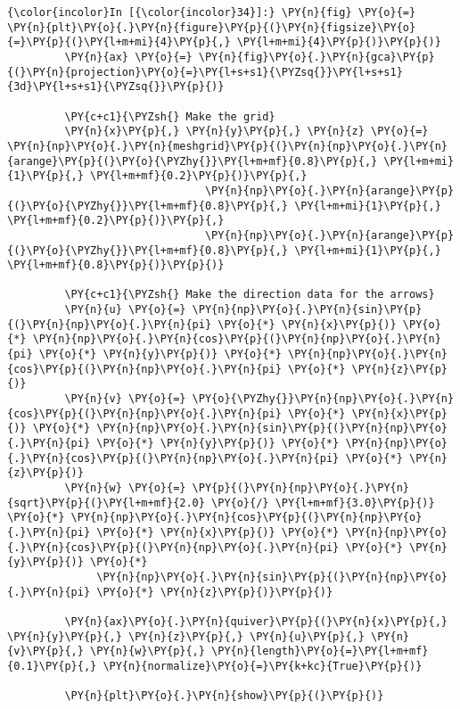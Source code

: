     \begin{Verbatim}[commandchars=\\\{\},frame=single,framerule=0.3mm,rulecolor=\color{cellframecolor}]
{\color{incolor}In [{\color{incolor}34}]:} \PY{n}{fig} \PY{o}{=} \PY{n}{plt}\PY{o}{.}\PY{n}{figure}\PY{p}{(}\PY{n}{figsize}\PY{o}{=}\PY{p}{(}\PY{l+m+mi}{4}\PY{p}{,} \PY{l+m+mi}{4}\PY{p}{)}\PY{p}{)}
         \PY{n}{ax} \PY{o}{=} \PY{n}{fig}\PY{o}{.}\PY{n}{gca}\PY{p}{(}\PY{n}{projection}\PY{o}{=}\PY{l+s+s1}{\PYZsq{}}\PY{l+s+s1}{3d}\PY{l+s+s1}{\PYZsq{}}\PY{p}{)}
         
         \PY{c+c1}{\PYZsh{} Make the grid}
         \PY{n}{x}\PY{p}{,} \PY{n}{y}\PY{p}{,} \PY{n}{z} \PY{o}{=} \PY{n}{np}\PY{o}{.}\PY{n}{meshgrid}\PY{p}{(}\PY{n}{np}\PY{o}{.}\PY{n}{arange}\PY{p}{(}\PY{o}{\PYZhy{}}\PY{l+m+mf}{0.8}\PY{p}{,} \PY{l+m+mi}{1}\PY{p}{,} \PY{l+m+mf}{0.2}\PY{p}{)}\PY{p}{,}
                               \PY{n}{np}\PY{o}{.}\PY{n}{arange}\PY{p}{(}\PY{o}{\PYZhy{}}\PY{l+m+mf}{0.8}\PY{p}{,} \PY{l+m+mi}{1}\PY{p}{,} \PY{l+m+mf}{0.2}\PY{p}{)}\PY{p}{,}
                               \PY{n}{np}\PY{o}{.}\PY{n}{arange}\PY{p}{(}\PY{o}{\PYZhy{}}\PY{l+m+mf}{0.8}\PY{p}{,} \PY{l+m+mi}{1}\PY{p}{,} \PY{l+m+mf}{0.8}\PY{p}{)}\PY{p}{)}
         
         \PY{c+c1}{\PYZsh{} Make the direction data for the arrows}
         \PY{n}{u} \PY{o}{=} \PY{n}{np}\PY{o}{.}\PY{n}{sin}\PY{p}{(}\PY{n}{np}\PY{o}{.}\PY{n}{pi} \PY{o}{*} \PY{n}{x}\PY{p}{)} \PY{o}{*} \PY{n}{np}\PY{o}{.}\PY{n}{cos}\PY{p}{(}\PY{n}{np}\PY{o}{.}\PY{n}{pi} \PY{o}{*} \PY{n}{y}\PY{p}{)} \PY{o}{*} \PY{n}{np}\PY{o}{.}\PY{n}{cos}\PY{p}{(}\PY{n}{np}\PY{o}{.}\PY{n}{pi} \PY{o}{*} \PY{n}{z}\PY{p}{)}
         \PY{n}{v} \PY{o}{=} \PY{o}{\PYZhy{}}\PY{n}{np}\PY{o}{.}\PY{n}{cos}\PY{p}{(}\PY{n}{np}\PY{o}{.}\PY{n}{pi} \PY{o}{*} \PY{n}{x}\PY{p}{)} \PY{o}{*} \PY{n}{np}\PY{o}{.}\PY{n}{sin}\PY{p}{(}\PY{n}{np}\PY{o}{.}\PY{n}{pi} \PY{o}{*} \PY{n}{y}\PY{p}{)} \PY{o}{*} \PY{n}{np}\PY{o}{.}\PY{n}{cos}\PY{p}{(}\PY{n}{np}\PY{o}{.}\PY{n}{pi} \PY{o}{*} \PY{n}{z}\PY{p}{)}
         \PY{n}{w} \PY{o}{=} \PY{p}{(}\PY{n}{np}\PY{o}{.}\PY{n}{sqrt}\PY{p}{(}\PY{l+m+mf}{2.0} \PY{o}{/} \PY{l+m+mf}{3.0}\PY{p}{)} \PY{o}{*} \PY{n}{np}\PY{o}{.}\PY{n}{cos}\PY{p}{(}\PY{n}{np}\PY{o}{.}\PY{n}{pi} \PY{o}{*} \PY{n}{x}\PY{p}{)} \PY{o}{*} \PY{n}{np}\PY{o}{.}\PY{n}{cos}\PY{p}{(}\PY{n}{np}\PY{o}{.}\PY{n}{pi} \PY{o}{*} \PY{n}{y}\PY{p}{)} \PY{o}{*}
              \PY{n}{np}\PY{o}{.}\PY{n}{sin}\PY{p}{(}\PY{n}{np}\PY{o}{.}\PY{n}{pi} \PY{o}{*} \PY{n}{z}\PY{p}{)}\PY{p}{)}
         
         \PY{n}{ax}\PY{o}{.}\PY{n}{quiver}\PY{p}{(}\PY{n}{x}\PY{p}{,} \PY{n}{y}\PY{p}{,} \PY{n}{z}\PY{p}{,} \PY{n}{u}\PY{p}{,} \PY{n}{v}\PY{p}{,} \PY{n}{w}\PY{p}{,} \PY{n}{length}\PY{o}{=}\PY{l+m+mf}{0.1}\PY{p}{,} \PY{n}{normalize}\PY{o}{=}\PY{k+kc}{True}\PY{p}{)}
         
         \PY{n}{plt}\PY{o}{.}\PY{n}{show}\PY{p}{(}\PY{p}{)}
\end{Verbatim}


